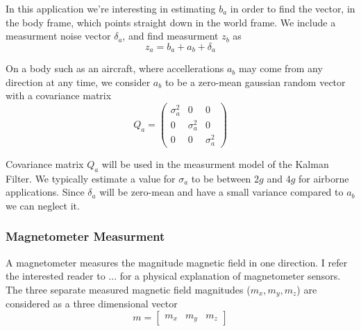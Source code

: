 \documentclass[12pt]{report}
\begin{document}
In this application we're interesting in estimating $b_a$ in order to find the vector, in the body frame, which points straight down in the world frame. We include a measurment noise vector $\delta_a$, and find measurment $z_b$ as
\begin{equation} \label{eq:findgb}
  z_a = b_a + a_b + \delta_a
\end{equation}

On a body such as an aircraft, where accellerations $a_b$ may come from any direction at any time, we consider $a_b$ to be a zero-mean gaussian random vector with a covariance matrix 
\begin{equation} \label{eq:Qa}
  Q_a = \begin{pmatrix} \sigma_a^2 & 0 & 0 \\
	                      0 & \sigma_a^2 & 0 \\ 
	                      0 & 0 & \sigma_a^2 \end{pmatrix} 
\end{equation}

Covariance matrix $Q_a$ will be used in the measurment model of the Kalman Filter. We typically estimate a value for $\sigma_a$ to be between 2$g$ and 4$g$ for airborne applications. Since $\delta_a$ will be zero-mean and have a small variance compared to $a_b$ we can neglect it.

\subsubsection{Magnetometer Measurment}

A magnetometer measures the magnitude magnetic field in one direction. I refer the interested reader to ... for a physical explanation of magnetometer sensors. The three separate measured magnetic field magnitudes ($m_x, m_y, m_z$) are considered as a three dimensional vector
\begin{equation} \label{eq:defb}
  m = \begin{bmatrix} m_x & m_y & m_z \end{bmatrix}
\end{equation}
\end{document}
